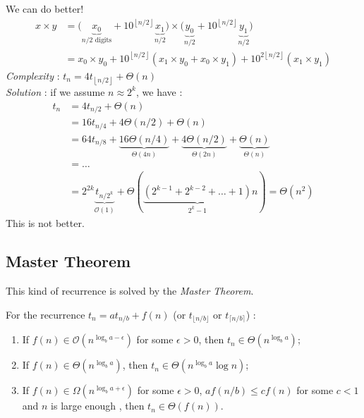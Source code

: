 We can do better!\\
\begin{align*}
x\times y&=\big(\underbrace{x_0}_{n/2 \text{ digits}}+10^{\left\lfloor n/2\right\rfloor} \underbrace{x_1}_{n/2}\big)\times \big(\underbrace{y_0}_{n/2}+10^{\left\lfloor n/2\right\rfloor} \underbrace{y_1}_{n/2}\big)\\
&=x_0 \times y_0 + 10^{\left\lfloor n/2\right\rfloor} (x_1 \times y_0 + x_0 \times y_1)+10^{2{\left\lfloor n/2\right\rfloor}}(x_1\times y_1)
\end{align*}
\emph{Complexity} : $t_n=4t_{\left\lfloor n/2\right\rfloor}+\Theta(n)$\\
\emph{Solution} : if we assume $n\approx 2^k$, we have : 
\begin{align*}
t_n&=4t_{n/2}+\Theta(n)\\
&=16t_{n/4}+4 \Theta(n/2)+\Theta(n)\\
&=64t_{n/8}+\underbrace{16\Theta(n/4)}_{\Theta(4n)}+\underbrace{4 \Theta(n/2)}_{\Theta(2n)}+\underbrace{\Theta(n)}_{\Theta(n)}\\
&=\hdots\\
&=2^{2k}\underbrace{t_{n/2^k}}_{\mathcal{O}(1)}+\Theta(\underbrace{(2^{k-1}+2^{k-2}+\hdots+1)}_{2^k-1}n)=\Theta(n^2)
\end{align*}
This is not better.\\

\subsection{Master Theorem}

This kind of recurrence is solved by the \emph{Master Theorem}.\\
\begin{theorem}[Master]
\label{MasterTheorem}
For the recurrence $t_n=at_{n/b}+f(n)$ (or $t_{\lfloor n/b \rfloor}$ or $t_{\lceil n/b \rceil}$) : 
\begin{enumerate}%
\item If $f(n)\in \mathcal{O}\left(n^{\log_ba-\epsilon}\right)$ for some $\epsilon>0$, then $t_n \in \Theta\left(n^{\log_ba}\right)$; \label{a}
\item If $f(n)\in \Theta\left(n^{\log_ba}\right)$, then $t_n \in \Theta\left(n^{\log_ba}\log n\right)$; \label{b}
\item If $f(n)\in \Omega\left(n^{\log_ba+\epsilon}\right)$ for some $\epsilon>0$, $af(n/b)\leq cf(n)$ for some $c<1$ and $n$ is large enough , then $t_n \in \Theta\left( f(n)\right)$.
\end{enumerate}
\end{theorem}

